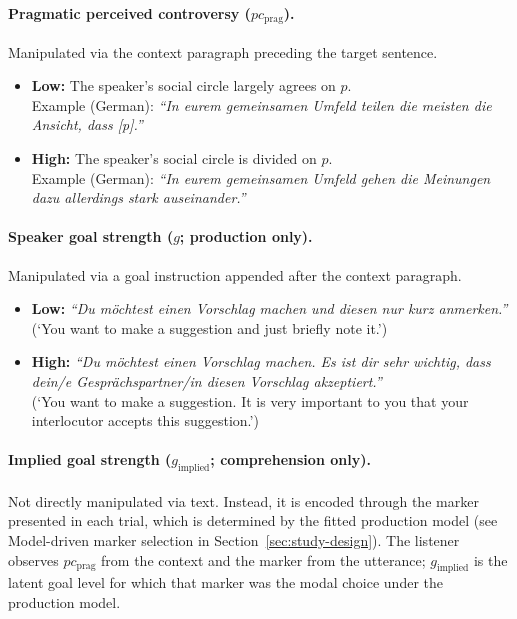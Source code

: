 \documentclass[12pt]{article}
\begin{document}
\paragraph{Pragmatic perceived controversy ($pc_{\text{prag}}$).}
Manipulated via the context paragraph preceding the target sentence.
\begin{itemize}
    \item \textbf{Low:} The speaker's social circle largely agrees on $p$.\\
    Example (German): \textit{``In eurem gemeinsamen Umfeld teilen die meisten die Ansicht, dass [p].''}
    \item \textbf{High:} The speaker's social circle is divided on $p$.\\
    Example (German): \textit{``In eurem gemeinsamen Umfeld gehen die Meinungen dazu allerdings stark auseinander.''}
\end{itemize}

\paragraph{Speaker goal strength ($g$; production only).}
Manipulated via a goal instruction appended after the context paragraph.
\begin{itemize}
    \item \textbf{Low:} \textit{``Du m\"ochtest einen Vorschlag machen und diesen nur kurz anmerken.''} (`You want to make a suggestion and just briefly note it.')
    \item \textbf{High:} \textit{``Du m\"ochtest einen Vorschlag machen. Es ist dir sehr wichtig, dass dein/e Gespr\"achspartner/in diesen Vorschlag akzeptiert.''}\\(`You want to make a suggestion. It is very important to you that your interlocutor accepts this suggestion.')
\end{itemize}

\paragraph{Implied goal strength ($g_{\text{implied}}$; comprehension only).}
Not directly manipulated via text. Instead, it is encoded through the marker presented in each trial, which is determined by the fitted production model (see Model-driven marker selection in Section~\ref{sec:study-design}). The listener observes $pc_{\text{prag}}$ from the context and the marker from the utterance; $g_{\text{implied}}$ is the latent goal level for which that marker was the modal choice under the production model.
\end{document}
